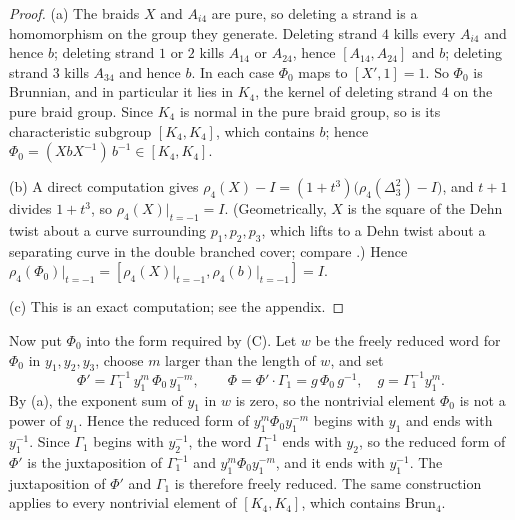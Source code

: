 \documentclass[11pt]{amsart}
\theoremstyle{remark}
\newcommand{\Brun}{\mathrm{Brun}}
\newcommand{\at}{\big|_{t=-1}}
\begin{document}
\begin{proof}
(a) The braids $X$ and $A_{i4}$ are pure, so deleting a strand is a homomorphism on the group they generate. Deleting strand $4$ kills every $A_{i4}$ and hence $b$; deleting strand $1$ or $2$ kills $A_{14}$ or $A_{24}$, hence $[A_{14},A_{24}]$ and $b$; deleting strand $3$ kills $A_{34}$ and hence $b$. In each case $\Phi_0$ maps to $[X',1]=1$. So $\Phi_0$ is Brunnian, and in particular it lies in $K_4$, the kernel of deleting strand $4$ on the pure braid group. Since $K_4$ is normal in the pure braid group, so is its characteristic subgroup $[K_4,K_4]$, which contains $b$; hence $\Phi_0=(XbX^{-1})\,b^{-1}\in[K_4,K_4]$.

(b) A direct computation gives $\rho_4(X)-I=(1+t^3)\bigl(\rho_4(\Delta_3^2)-I\bigr)$, and $t+1$ divides $1+t^3$, so $\rho_4(X)\at=I$. (Geometrically, $X$ is the square of the Dehn twist about a curve surrounding $p_1,p_2,p_3$, which lifts to a Dehn twist about a separating curve in the double branched cover; compare \cite{BMP}.) Hence $\rho_4(\Phi_0)\at=[\rho_4(X)\at,\rho_4(b)\at]=I$.

(c) This is an exact computation; see the appendix.
\end{proof}

Now put $\Phi_0$ into the form required by (C). Let $w$ be the freely reduced word for $\Phi_0$ in $y_1,y_2,y_3$, choose $m$ larger than the length of $w$, and set
\[
\Phi'=\Gamma_1^{-1}\,y_1^{m}\,\Phi_0\,y_1^{-m},\qquad \Phi=\Phi'\cdot\Gamma_1=g\,\Phi_0\,g^{-1},\quad g=\Gamma_1^{-1}y_1^{m}.
\]
By (a), the exponent sum of $y_1$ in $w$ is zero, so the nontrivial element $\Phi_0$ is not a power of $y_1$. Hence the reduced form of $y_1^m\Phi_0y_1^{-m}$ begins with $y_1$ and ends with $y_1^{-1}$. Since $\Gamma_1$ begins with $y_2^{-1}$, the word $\Gamma_1^{-1}$ ends with $y_2$, so the reduced form of $\Phi'$ is the juxtaposition of $\Gamma_1^{-1}$ and $y_1^m\Phi_0y_1^{-m}$, and it ends with $y_1^{-1}$. The juxtaposition of $\Phi'$ and $\Gamma_1$ is therefore freely reduced. The same construction applies to every nontrivial element of $[K_4,K_4]$, which contains $\Brun_4$.
\end{document}
